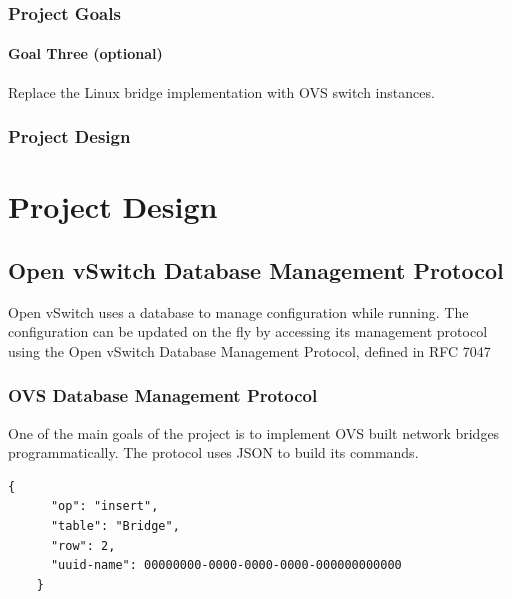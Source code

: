 \documentclass[pdf]{beamer}
\begin{document}
\begin{frame}
	\frametitle{Project Goals}
	\framesubtitle{Goal Three (optional)}
	Replace the Linux bridge implementation with OVS switch instances.
\end{frame}

\begin{frame}
	\frametitle{Project Design}
	\section{Project Design}
	\subsection{Open vSwitch Database Management Protocol}

	Open vSwitch uses a database to manage configuration while running.
	The configuration can be updated on the fly by accessing its management
	protocol using the Open vSwitch Database Management Protocol, defined
	in RFC 7047\cite{rfc7047}
\end{frame}

\begin{frame}[fragile]
	\frametitle{OVS Database Management Protocol}
	One of the main goals of the project is to implement OVS built network
	bridges programmatically. The protocol uses JSON to build its commands.
	\\
	\begin{lstlisting}[caption=Example insert OVS DB Management Protocol]
	{
	  "op": "insert",
	  "table": "Bridge",
	  "row": 2,
	  "uuid-name": 00000000-0000-0000-0000-000000000000
	}
	\end{lstlisting}
\end{frame}
\end{document}
